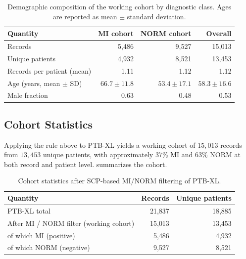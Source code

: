 \begin{table}[h]
\centering
\caption{Demographic composition of the working cohort by diagnostic class. Ages are reported as mean $\pm$ standard deviation.}
\label{tab:demographics}
\begin{tabular}{lrrr}
\toprule
\textbf{Quantity}              & \textbf{MI cohort} & \textbf{NORM cohort} & \textbf{Overall} \\
\midrule
Records                        & 5{,}486            & 9{,}527              & 15{,}013         \\
Unique patients                & 4{,}932            & 8{,}521              & 13{,}453         \\
Records per patient (mean)     & 1.11               & 1.12                 & 1.12             \\
Age (years, mean $\pm$ SD)     & $66.7 \pm 11.8$    & $53.4 \pm 17.1$      & $58.3 \pm 16.6$  \\
Male fraction                  & 0.63               & 0.48                 & 0.53             \\
\bottomrule
\end{tabular}
\end{table}

\subsection{Cohort Statistics}

Applying the rule above to PTB-XL yields a working cohort of $15{,}013$ records from $13{,}453$ unique patients, with approximately $37$\% MI and $63$\% NORM at both record and patient level.  summarizes the cohort.

\begin{table}[h]
\centering
\caption{Cohort statistics after SCP-based MI/NORM filtering of PTB-XL.}
\label{tab:cohort}
\begin{tabular}{lrr}
\toprule
\textbf{Quantity} & \textbf{Records} & \textbf{Unique patients} \\
\midrule
PTB-XL total                            & 21{,}837 & 18{,}885 \\
After MI / NORM filter (working cohort) & 15{,}013 & 13{,}453 \\
\quad of which MI (positive)            &  5{,}486 &  4{,}932 \\
\quad of which NORM (negative)          &  9{,}527 &  8{,}521 \\
\bottomrule
\end{tabular}
\end{table}

